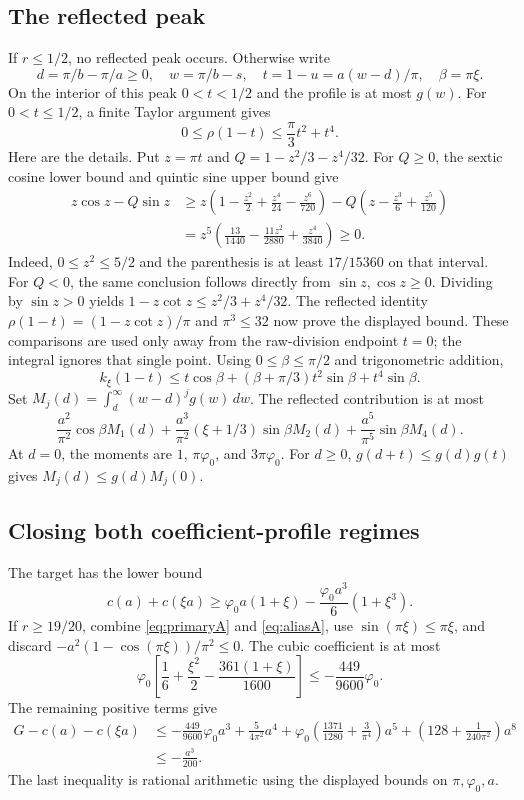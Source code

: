 \documentclass[11pt]{article}
\newcommand{\phz}{\varphi_0}
\begin{document}
\subsection{The reflected peak}

If $r\le1/2$, no reflected peak occurs. Otherwise write
\[
 d=\pi/b-\pi/a\ge0,\quad w=\pi/b-s,\quad t=1-u=a(w-d)/\pi,
 \quad\beta=\pi\xi.
\]
On the interior of this peak $0<t<1/2$ and the profile is at most $g(w)$.
For $0<t\le1/2$, a finite Taylor argument gives
\[
 0\le\rho(1-t)\le\frac\pi3t^2+t^4.
\]
Here are the details. Put $z=\pi t$ and $Q=1-z^2/3-z^4/32$.
For $Q\ge0$, the sextic cosine lower bound and quintic sine upper bound
give
\begin{align*}
 z\cos z-Q\sin z
 &\ge z\left(1-\frac{z^2}2+\frac{z^4}{24}-\frac{z^6}{720}\right)
       -Q\left(z-\frac{z^3}6+\frac{z^5}{120}\right)\\
 &=z^5\left(\frac{13}{1440}-\frac{11z^2}{2880}
                                 +\frac{z^4}{3840}\right)\ge0.
\end{align*}
Indeed, $0\le z^2\le5/2$ and the parenthesis is at least $17/15360$ on
that interval. For $Q<0$, the same conclusion follows directly from
$\sin z,\cos z\ge0$. Dividing by $\sin z>0$ yields
$1-z\cot z\le z^2/3+z^4/32$. The reflected identity
$\rho(1-t)=(1-z\cot z)/\pi$ and $\pi^3\le32$ now prove the displayed
bound. These comparisons are used only away from the raw-division
endpoint $t=0$; the integral ignores that single point.
Using $0\le\beta\le\pi/2$ and trigonometric addition,
\[
 k_\xi(1-t)\le t\cos\beta+(\beta+\pi/3)t^2\sin\beta+t^4\sin\beta.
\]
Set $M_j(d)=\int_d^\infty(w-d)^jg(w)\,dw$. The reflected contribution is
at most
\begin{equation}\label{eq:aliasA}
 \frac{a^2}{\pi^2}\cos\beta M_1(d)
 +\frac{a^3}{\pi^2}(\xi+1/3)\sin\beta M_2(d)
 +\frac{a^5}{\pi^5}\sin\beta M_4(d).
\end{equation}
At $d=0$, the moments are $1$, $\pi\phz$, and $3\pi\phz$.
For $d\ge0$, $g(d+t)\le g(d)g(t)$ gives $M_j(d)\le g(d)M_j(0)$.

\subsection{Closing both coefficient-profile regimes}

The target has the lower bound
\[
 c(a)+c(\xi a)\ge\phz a(1+\xi)-\frac{\phz a^3}{6}(1+\xi^3).
\]
If $r\ge19/20$, combine \eqref{eq:primaryA} and \eqref{eq:aliasA}, use
$\sin(\pi\xi)\le\pi\xi$, and discard
$-a^2(1-\cos(\pi\xi))/\pi^2\le0$. The cubic coefficient is at most
\[
 \phz\left[\frac16+\frac{\xi^2}2-\frac{361(1+\xi)}{1600}\right]
 \le-\frac{449}{9600}\phz.
\]
The remaining positive terms give
\begin{align*}
 G-c(a)-c(\xi a)
 &\le-\frac{449}{9600}\phz a^3+\frac5{4\pi^2}a^4
 +\phz\left(\frac{1371}{1280}+\frac3{\pi^4}\right)a^5
 +\left(128+\frac1{240\pi^2}\right)a^8\\
 &\le-\frac{a^3}{200}.
\end{align*}
The last inequality is rational arithmetic using the displayed bounds on
$\pi,\phz,a$.
\end{document}
